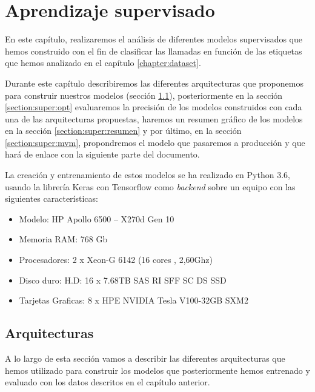 \chapter{Aprendizaje supervisado}
\label{chapter:super}
En este capítulo, realizaremos el análisis de diferentes modelos supervisados que hemos construido con el fin de clasificar las llamadas en función de las etiquetas que hemos analizado en el capítulo \ref{chapter:dataset}.

Durante este capítulo describiremos las diferentes arquitecturas que proponemos para construir nuestros modelos (sección  \ref{section:super:arq}), posteriormente en la sección \ref{section:super:opt} evaluaremos la precisión de los modelos construidos con cada una de las arquitecturas propuestas, haremos un resumen gráfico de los modelos en la sección \ref{section:super:resumen} y por último, en la sección \ref{section:super:mvm}, propondremos el modelo que pasaremos a producción y que hará de enlace con la siguiente parte del documento. 

La creación y entrenamiento de estos modelos se ha realizado en Python 3.6, usando la librería Keras con Tensorflow como \textit{backend} sobre un equipo con las siguientes características:

\begin{itemize}
\item Modelo: HP Apollo 6500 – X270d Gen 10

\item Memoria RAM: 768 Gb

\item Procesadores: 2 x Xeon-G 6142 (16 cores , 2,60Ghz)

\item Disco duro: H.D: 16 x 7.68TB SAS RI SFF SC DS SSD

\item Tarjetas Graficas: 8 x HPE NVIDIA Tesla V100-32GB SXM2
\end{itemize}



\section{Arquitecturas}
\label{section:super:arq}

A lo largo de esta sección vamos a describir las diferentes arquitecturas que hemos utilizado para construir los modelos que posteriormente hemos entrenado y evaluado con los datos descritos en el capítulo anterior. 

